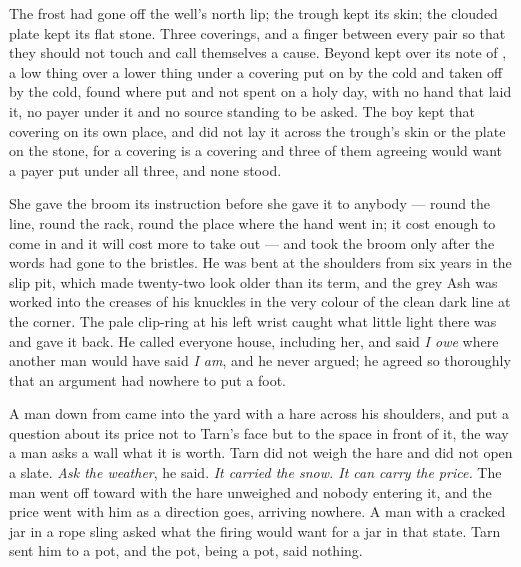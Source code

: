 The frost had gone off the well's north lip; the trough kept its skin; the clouded plate kept its flat stone. Three coverings, and a finger between every pair so that they should not touch and call themselves a cause. Beyond   kept  over its note of , a low thing over a lower thing under a covering put on by the cold and taken off by the cold, found where put and not spent on a holy day, with no hand that laid it, no payer under it and no source standing to be asked. The boy kept that covering on its own place, and did not lay it across the trough's skin or the plate on the stone, for a covering is a covering and three of them agreeing would want a payer put under all three, and none stood.

She gave the broom its instruction before she gave it to anybody --- round the line, round the rack, round the place where the hand went in; it cost enough to come in and it will cost more to take out --- and  took the broom only after the words had gone to the bristles. He was bent at the shoulders from six years in the slip pit, which made twenty-two look older than its term, and the grey Ash was worked into the creases of his knuckles in the very colour of the clean dark line at the corner. The pale clip-ring at his left wrist caught what little light there was and gave it back. He called everyone house, including her, and said \emph{I owe} where another man would have said \emph{I am}, and he never argued; he agreed so thoroughly that an argument had nowhere to put a foot.

A man down from  came into the yard with a hare across his shoulders, and put a question about its price not to Tarn's face but to the space in front of it, the way a man asks a wall what it is worth. Tarn did not weigh the hare and did not open a slate. \emph{Ask the weather}, he said. \emph{It carried the snow. It can carry the price.} The man went off toward  with the hare unweighed and nobody entering it, and the price went with him as a direction goes, arriving nowhere. A man with a cracked jar in a rope sling asked what the firing would want for a jar in that state. Tarn sent him to a pot, and the pot, being a pot, said nothing.

